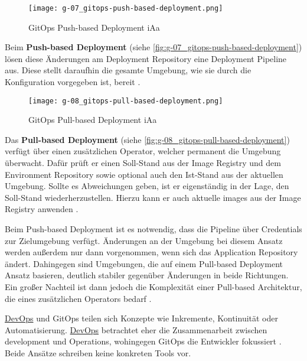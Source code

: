 \begin{figure}[h]
    \centering
    \texttt{[image: g-07\_gitops-push-based-deployment.png]}
    \caption{GitOps Push-based Deployment \acrshort{iAa} \citeauthor{109:GitOps}}
    \label{fig:g-07_gitops-push-based-deployment}
\end{figure}

Beim \textbf{Push-based Deployment} (siehe \autoref{fig:g-07_gitops-push-based-deployment}) lösen diese Änderungen am Deployment Repository eine Deployment Pipeline aus. Diese stellt daraufhin die gesamte Umgebung, wie sie durch die Konfiguration vorgegeben ist, bereit \cite{109:GitOps}.

\begin{figure}[h]
    \centering
    \texttt{[image: g-08\_gitops-pull-based-deployment.png]}
    \caption{GitOps Pull-based Deployment \acrshort{iAa} \citeauthor{109:GitOps}}
    \label{fig:g-08_gitops-pull-based-deployment}
\end{figure}

Das \textbf{Pull-based Deployment} (siehe \autoref{fig:g-08_gitops-pull-based-deployment}) verfügt über einen zusätzlichen Operator, welcher permanent die Umgebung überwacht. Dafür prüft er einen Soll-Stand aus der Image Registry und dem Environment Repository sowie optional auch den Ist-Stand aus der aktuellen Umgebung. Sollte es Abweichungen geben, ist er eigenständig in der Lage, den Soll-Stand wiederherzustellen. Hierzu kann er auch aktuelle \Glspl{image} aus der Image Registry anwenden \cite{109:GitOps}.

Beim Push-based Deployment ist es notwendig, dass die Pipeline über Credentials zur Zielumgebung verfügt. Änderungen an der Umgebung bei diesem Ansatz werden außerdem nur dann vorgenommen, wenn sich das Application Repository ändert. Dahingegen sind Umgebungen, die auf einem Pull-based Deployment Ansatz basieren, deutlich stabiler gegenüber Änderungen in beide Richtungen. Ein großer Nachteil ist dann jedoch die Komplexität einer Pull-based Architektur, die eines zusätzlichen Operators bedarf \cite{109:GitOps}.

\hyperref[sec:03-01_devops]{DevOps} und GitOps teilen sich Konzepte wie Inkremente, Kontinuität oder Automatisierung. \hyperref[sec:03-01_devops]{DevOps} betrachtet eher die Zusammenarbeit zwischen \Gls{development} und Operations, wohingegen GitOps die Entwickler fokussiert \cite{009:GitOps-Evolution-of-DevOps}. Beide Ansätze schreiben keine konkreten Tools vor.

